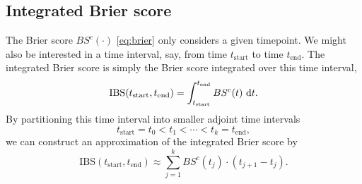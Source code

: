 \subsection{Integrated Brier score}
The Brier score $BS^c(\cdot)$ \eqref{eq:brier} only considers a given timepoint.
We might also be interested in a time interval, say, from time $t_{\text{start}}$ to time $t_{\text{end}}$.
The integrated Brier score is simply the Brier score integrated over this time interval,
\begin{equation*}
    \text{IBS}(t_{\text{start}}, t_{\text{end}})=\int_{t_{\text{start}}}^{t_{\text{end}}}BS^c(t)~\text{d} t.
\end{equation*}
By partitioning this time interval into smaller adjoint time intervals
\begin{equation*}
    t_{\text{start}}=t_0<t_1<\cdots<t_k=t_{\text{end}},
\end{equation*}
we can construct an approximation of the integrated Brier score by
\begin{equation*}
    \text{IBS}(t_{\text{start}}, t_{\text{end}})\approx\sum_{j=1}^k BS^c(t_j)\cdot(t_{j+1}-t_{j}).
\end{equation*}
